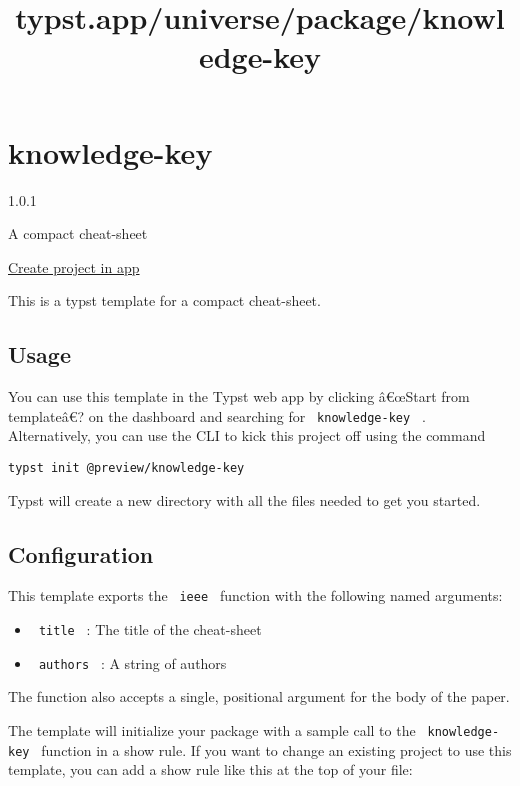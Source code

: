 \title{typst.app/universe/package/knowledge-key}

\label{banner}
\label{template-thumbnail}

\section{knowledge-key}\label{knowledge-key}

{ 1.0.1 }

A compact cheat-sheet

\href{/app?template=knowledge-key&version=1.0.1}{Create project in app}

\label{readme}
This is a typst template for a compact cheat-sheet.

\subsection{Usage}\label{usage}

You can use this template in the Typst web app by clicking â€œStart from
templateâ€? on the dashboard and searching for
\texttt{\ knowledge-key\ } . Alternatively, you can use the CLI to kick
this project off using the command

\begin{verbatim}
typst init @preview/knowledge-key
\end{verbatim}

Typst will create a new directory with all the files needed to get you
started.

\subsection{Configuration}\label{configuration}

This template exports the \texttt{\ ieee\ } function with the following
named arguments:

\begin{itemize}
\tightlist
\item
  \texttt{\ title\ } : The title of the cheat-sheet
\item
  \texttt{\ authors\ } : A string of authors
\end{itemize}

The function also accepts a single, positional argument for the body of
the paper.

The template will initialize your package with a sample call to the
\texttt{\ knowledge-key\ } function in a show rule. If you want to
change an existing project to use this template, you can add a show rule
like this at the top of your file:

